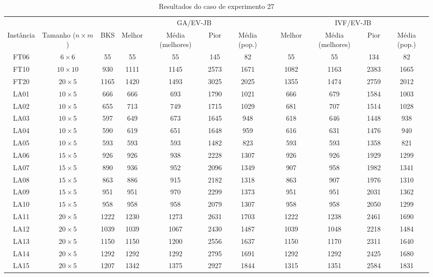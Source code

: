 \begin{sidewaystable}
\caption{Resultados do caso de experimento 27}
\centering
\label{experimento27}
\begin{tabular}{cccccccccccc}
\toprule
& & & \multicolumn{4}{c}{GA/EV-JB} & & \multicolumn{4}{c}{IVF/EV-JB} \\
\cmidrule(c){4-7}
\cmidrule(c){9-12}
Inst\^{a}ncia & Tamanho ($n \times m$) & BKS & Melhor & M\'{e}dia (melhores) & Pior & M\'{e}dia (pop.) & & Melhor & M\'{e}dia (melhores) & Pior & M\'{e}dia (pop.) \\
\midrule
FT06 & $6 \times 6$ & 55 & 55 & 55 & 145 & 82 & & 55 & 55 & 134 & 82 \\
FT10 & $10 \times 10$ & 930 & 1111 & 1145 & 2573 & 1671 & & 1082 & 1163 & 2383 & 1665 \\
FT20 & $20 \times 5$ & 1165 & 1420 & 1493 & 3025 & 2025 & & 1355 & 1474 & 2759 & 2012 \\
LA01 & $10 \times 5$ & 666 & 666 & 693 & 1790 & 1021 & & 666 & 679 & 1584 & 1003 \\
LA02 & $10 \times 5$ & 655 & 713 & 749 & 1715 & 1029 & & 681 & 707 & 1514 & 1028 \\
LA03 & $10 \times 5$ & 597 & 649 & 673 & 1645 & 948 & & 618 & 646 & 1448 & 938 \\
LA04 & $10 \times 5$ & 590 & 619 & 651 & 1648 & 959 & & 616 & 631 & 1476 & 940 \\
LA05 & $10 \times 5$ & 593 & 593 & 593 & 1482 & 823 & & 593 & 593 & 1358 & 821 \\
LA06 & $15 \times 5$ & 926 & 926 & 938 & 2228 & 1307 & & 926 & 926 & 1929 & 1299 \\
LA07 & $15 \times 5$ & 890 & 936 & 952 & 2096 & 1349 & & 907 & 958 & 1982 & 1341 \\
LA08 & $15 \times 5$ & 863 & 886 & 915 & 2182 & 1318 & & 863 & 907 & 1976 & 1310 \\
LA09 & $15 \times 5$ & 951 & 951 & 970 & 2299 & 1373 & & 951 & 951 & 2031 & 1362 \\
LA10 & $15 \times 5$ & 958 & 958 & 958 & 2079 & 1307 & & 958 & 958 & 2050 & 1299 \\
LA11 & $20 \times 5$ & 1222 & 1230 & 1273 & 2631 & 1703 & & 1222 & 1238 & 2461 & 1690 \\
LA12 & $20 \times 5$ & 1039 & 1039 & 1067 & 2430 & 1487 & & 1039 & 1048 & 2218 & 1484 \\
LA13 & $20 \times 5$ & 1150 & 1150 & 1200 & 2556 & 1637 & & 1150 & 1170 & 2311 & 1640 \\
LA14 & $20 \times 5$ & 1292 & 1292 & 1292 & 2795 & 1691 & & 1292 & 1292 & 2425 & 1680 \\
LA15 & $20 \times 5$ & 1207 & 1342 & 1375 & 2927 & 1844 & & 1315 & 1351 & 2584 & 1831 \\
\bottomrule
\end{tabular}
\end{sidewaystable}
